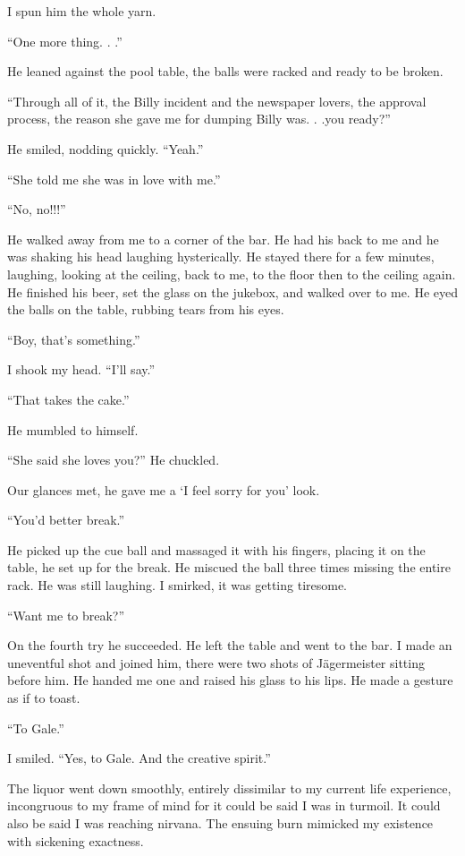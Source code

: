 I spun him the whole yarn.

``One more thing. . .''

He leaned against the pool table, the balls were racked and ready to be
broken.

``Through all of it, the Billy incident and the newspaper lovers, the
approval process, the reason she gave me for dumping Billy was. . .you
ready?''

He smiled, nodding quickly. ``Yeah.''

``She told me she was in love with me.''

``No, no!!!''

He walked away from me to a corner of the bar. He had his back to me and
he was shaking his head laughing hysterically. He stayed there for a few
minutes, laughing, looking at the ceiling, back to me, to the floor then
to the ceiling again. He finished his beer, set the glass on the
jukebox, and walked over to me. He eyed the balls on the table, rubbing
tears from his eyes.

``Boy, that's something.''

I shook my head. ``I'll say.''

``That takes the cake.''

He mumbled to himself.

``She said she loves you?'' He chuckled.

Our glances met, he gave me a `I feel sorry for you' look.

``You'd better break.''

He picked up the cue ball and massaged it with his fingers, placing it
on the table, he set up for the break. He miscued the ball three times
missing the entire rack. He was still laughing. I smirked, it was
getting tiresome.

``Want me to break?''

On the fourth try he succeeded. He left the table and went to the bar. I
made an uneventful shot and joined him, there were two shots of
Jägermeister sitting before him. He handed me one and raised his glass
to his lips. He made a gesture as if to toast.

``To Gale.''

I smiled. ``Yes, to Gale. And the creative spirit.''

The liquor went down smoothly, entirely dissimilar to my current life
experience, incongruous to my frame of mind for it could be said I was
in turmoil. It could also be said I was reaching nirvana. The ensuing
burn mimicked my existence with sickening exactness.


